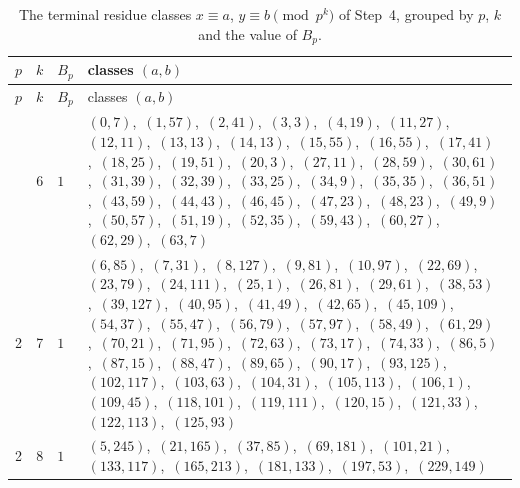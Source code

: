 \documentclass[11pt]{article}
\begin{document}
\begingroup\small
\setlength{\LTcapwidth}{\textwidth}
\begin{longtable}{@{}rrl>{\raggedright\arraybackslash}p{}@{}}
\caption{The terminal residue classes $x\equiv a$, $y\equiv b\pmod{p^k}$ of Step~4, grouped by $p$, $k$ and the value of $B_p$.}\label{tab:local}\\
\hline $p$ & $k$ & $B_p$ & classes $(a,b)$\\\hline\endfirsthead
\hline $p$ & $k$ & $B_p$ & classes $(a,b)$\\\hline\endhead\hline\endfoot
2 & 6 & $1$ & $(0,7)$,\allowbreak\ $(1,57)$,\allowbreak\ $(2,41)$,\allowbreak\ $(3,3)$,\allowbreak\ $(4,19)$,\allowbreak\ $(11,27)$,\allowbreak\ $(12,11)$,\allowbreak\ $(13,13)$,\allowbreak\ $(14,13)$,\allowbreak\ $(15,55)$,\allowbreak\ $(16,55)$,\allowbreak\ $(17,41)$,\allowbreak\ $(18,25)$,\allowbreak\ $(19,51)$,\allowbreak\ $(20,3)$,\allowbreak\ $(27,11)$,\allowbreak\ $(28,59)$,\allowbreak\ $(30,61)$,\allowbreak\ $(31,39)$,\allowbreak\ $(32,39)$,\allowbreak\ $(33,25)$,\allowbreak\ $(34,9)$,\allowbreak\ $(35,35)$,\allowbreak\ $(36,51)$,\allowbreak\ $(43,59)$,\allowbreak\ $(44,43)$,\allowbreak\ $(46,45)$,\allowbreak\ $(47,23)$,\allowbreak\ $(48,23)$,\allowbreak\ $(49,9)$,\allowbreak\ $(50,57)$,\allowbreak\ $(51,19)$,\allowbreak\ $(52,35)$,\allowbreak\ $(59,43)$,\allowbreak\ $(60,27)$,\allowbreak\ $(62,29)$,\allowbreak\ $(63,7)$\\
2 & 7 & $1$ & $(6,85)$,\allowbreak\ $(7,31)$,\allowbreak\ $(8,127)$,\allowbreak\ $(9,81)$,\allowbreak\ $(10,97)$,\allowbreak\ $(22,69)$,\allowbreak\ $(23,79)$,\allowbreak\ $(24,111)$,\allowbreak\ $(25,1)$,\allowbreak\ $(26,81)$,\allowbreak\ $(29,61)$,\allowbreak\ $(38,53)$,\allowbreak\ $(39,127)$,\allowbreak\ $(40,95)$,\allowbreak\ $(41,49)$,\allowbreak\ $(42,65)$,\allowbreak\ $(45,109)$,\allowbreak\ $(54,37)$,\allowbreak\ $(55,47)$,\allowbreak\ $(56,79)$,\allowbreak\ $(57,97)$,\allowbreak\ $(58,49)$,\allowbreak\ $(61,29)$,\allowbreak\ $(70,21)$,\allowbreak\ $(71,95)$,\allowbreak\ $(72,63)$,\allowbreak\ $(73,17)$,\allowbreak\ $(74,33)$,\allowbreak\ $(86,5)$,\allowbreak\ $(87,15)$,\allowbreak\ $(88,47)$,\allowbreak\ $(89,65)$,\allowbreak\ $(90,17)$,\allowbreak\ $(93,125)$,\allowbreak\ $(102,117)$,\allowbreak\ $(103,63)$,\allowbreak\ $(104,31)$,\allowbreak\ $(105,113)$,\allowbreak\ $(106,1)$,\allowbreak\ $(109,45)$,\allowbreak\ $(118,101)$,\allowbreak\ $(119,111)$,\allowbreak\ $(120,15)$,\allowbreak\ $(121,33)$,\allowbreak\ $(122,113)$,\allowbreak\ $(125,93)$\\
2 & 8 & $1$ & $(5,245)$,\allowbreak\ $(21,165)$,\allowbreak\ $(37,85)$,\allowbreak\ $(69,181)$,\allowbreak\ $(101,21)$,\allowbreak\ $(133,117)$,\allowbreak\ $(165,213)$,\allowbreak\ $(181,133)$,\allowbreak\ $(197,53)$,\allowbreak\ $(229,149)$\\

\end{longtable}
\end{document}
